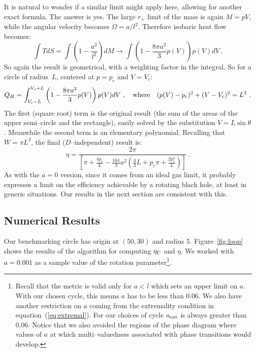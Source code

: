 \documentclass[letterpaper,11pt]{article}
\begin{document}
It is natural to wonder if a similar limit might apply here, allowing for another exact formula. The answer is yes. The large $r_+$ limit of the mass  is again $M=pV$, while the angular velocity  becomes $\Omega=a/l^2$. Therefore isobaric heat flow becomes:
\begin{equation}
\int TdS=\int\left(1-\frac{a^2}{l^2}\right)dM\longrightarrow\int\left(1-\frac{8\pi a^2}{3}p(V)\right)p(V)dV\ .
\end{equation}
So again the result is geometrical, with a weighting factor in the integral. So for a circle  of radius~$L$, centered at $p=p_c$ and $V=V_c$:
\begin{equation}
Q_H=\int_{V_c-L}^{V_c+L}\left(1-\frac{8\pi a^2}{3}p(V)\right)p(V)dV\ ,\quad {\rm where}\quad (p(V)-p_c)^2+(V-V_c)^2=L^2\ .
\end{equation}
The first (square root) term is the original result (the sum of the areas of the upper semi--circle and the rectangle), easily solved by the substitution $V=L\sin\theta$. %
Meanwhile the second term is an elementary polynomial. Recalling that $W=\pi L^2$,  the final ($D$--independent) result is:
\begin{equation}
\eta=\frac{2\pi}{\left[\pi+\frac{4p_c}{L}-\frac{16\pi}{3}a^2\left(\frac{4}{3}L+p_c\pi+\frac{2p_c^2}{L}\right)\right]}\ .
\label{eq:cjboundnew}
\end{equation}
As with the $a=0$ version, since it comes from an ideal gas limit, it probably expresses a limit on the efficiency achievable by a rotating black hole, at least in generic situations. Our results in the next section are consistent with this.%



\subsection{Numerical Results}
Our benchmarking circle has origin at $(50,30)$ and radius $5$.  Figure~\ref{fig:loop} shows the results of the algorithm for computing  $\eta_{\rm C}$ and $\eta$. We worked with $a=0.001$ as a sample value of the rotation parameter\footnote{Recall that the metric is valid only for $a<l$ which sets an upper limit on $a$. With our chosen cycle, this means $a$ has to be less than $0.06$. We also have another restriction on $a$ coming from the extremality condition in equation~(\ref{eq:extremal}). For our choices of cycle $a_{\rm ext}$ is always greater than $0.06$. Notice that we also avoided the regions of the phase diagram where values of $a$ at which multi--valuedness associated with phase transitions would develop.}. 
\end{document}
